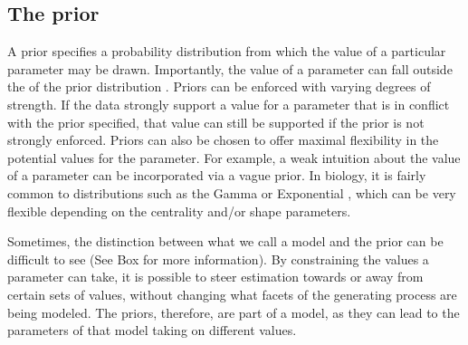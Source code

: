 \subsection{The prior}


A prior specifies a probability distribution from which the value of a particular parameter may be drawn.
Importantly, the  value of a parameter can fall outside the  of the prior distribution . %
Priors can be enforced with varying degrees of strength.
If the data strongly support a value for a parameter that is in conflict with the prior specified, that value can still be supported if the prior is not strongly enforced.
Priors can also be chosen to offer maximal flexibility in the potential values for the parameter.
For example, a weak intuition about the value of a parameter can be incorporated via a vague prior.
In biology, it is fairly common to  distributions such as the Gamma or Exponential , which can be very flexible depending on the centrality and/or shape parameters.

Sometimes, the distinction between what we call a model and the prior can be difficult to see (See Box  for more information).
By constraining the values a parameter can take, it is possible to steer estimation towards or away from certain sets of values, without changing what facets of the generating process are being modeled.
The priors, therefore, are part of a model, as they can lead to the parameters of that model taking on different values.

